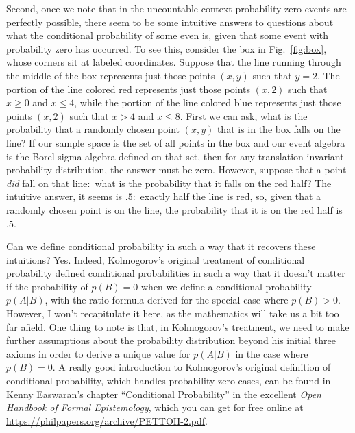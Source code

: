 \documentclass[11pt]{article}
\theoremstyle{definition}
\theoremstyle{remark}
\begin{document}
Second, once we note that in the uncountable context probability-zero events are perfectly possible, there seem to be some intuitive answers to questions about what the conditional probability of some even is, given that some event with probability zero has occurred. To see this, consider the box in Fig.~\ref{fig:box}, whose corners sit at labeled coordinates. Suppose that the line running through the middle of the box represents just those points $(x,y)$ such that $y=2$. The portion of the line colored red represents just those points $(x,2)$ such that $x\geq0$ and $x\leq 4$, while the portion of the line colored blue represents just those points $(x,2)$ such that $x>4$ and $x\leq 8$. First we can ask, what is the probability that a randomly chosen point $(x,y)$ that is in the box falls on the line? If our sample space is the set of all points in the box and our event algebra is the Borel sigma algebra defined on that set, then for any translation-invariant probability distribution, the answer must be zero. However, suppose that a point \textit{did} fall on that line:\ what is the probability that it falls on the red half? The intuitive answer, it seems is $.5$:\ exactly half the line is red, so, given that a randomly chosen point is on the line, the probability that it is on the red half is $.5$.\par


Can we define conditional probability in such a way that it recovers these intuitions? Yes. Indeed, Kolmogorov's original treatment of conditional probability defined conditional probabilities in such a way that it doesn't matter if the probability of $p(B)=0$ when we define a conditional probability $p(A|B)$, with the ratio formula derived for the special case where $p(B)>0$.  However, I won't recapitulate it here, as the mathematics will take us a bit too far afield. One thing to note is that, in Kolmogorov's treatment, we need to make further assumptions about the probability distribution beyond his initial three axioms in order to derive a unique value for $p(A|B)$ in the case where $p(B)=0$. A really good introduction to Kolmogorov's original definition of conditional probability, which handles probability-zero cases, can be found in Kenny Easwaran's chapter ``Conditional Probability'' in the excellent \textit{Open Handbook of Formal Epistemology}, which you can get for free online at \url{https://philpapers.org/archive/PETTOH-2.pdf}.\par 
\end{document}
